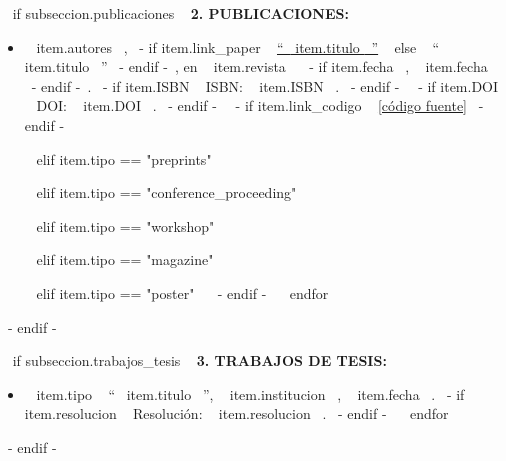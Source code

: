    ~{ if subseccion.publicaciones }~
      \textbf{2. PUBLICACIONES:}
      \begin{itemize}
      ~{ for item in subseccion.publicaciones }~
        ~{ if item.tipo == "articulo" }~
          \item ~{{ item.autores }}~, ~{- if item.link_paper }~ \href{~{{ item.link_paper }}~}{``~{{ item.titulo }}~''} ~{ else }~ ``~{{ item.titulo }}~'' ~{- endif -}~, en ~{{ item.revista }}~ ~{- if item.fecha }~, ~{{ item.fecha }}~ ~{- endif -}~.
                ~{- if item.ISBN }~ ISBN: ~{{ item.ISBN }}~. ~{- endif -}~
                ~{- if item.DOI }~ DOI: ~{{ item.DOI }}~. ~{- endif -}~
                ~{- if item.link_codigo }~ \href{~{{ item.link_codigo }}~}{[código fuente]} ~{- endif -}~
          \espacioEntreItems{}

        ~{ elif item.tipo == "preprints" }~

        ~{ elif item.tipo == "conference_proceeding" }~

        ~{ elif item.tipo == "workshop" }~

        ~{ elif item.tipo == "magazine" }~

        ~{ elif item.tipo == "poster" }~
        ~{- endif -}~
      ~{ endfor }~
      \end{itemize}
      \espacioEntreSubSecciones{}
    ~{- endif -}~

    ~{ if subseccion.trabajos_tesis }~
      \textbf{3. TRABAJOS DE TESIS:}
      \begin{itemize}
      ~{ for item in subseccion.trabajos_tesis }~
        \item ~{{ item.tipo }}~ ``~{{ item.titulo }}~'', ~{{ item.institucion }}~, ~{{ item.fecha }}~.
              ~{- if item.resolucion }~ Resolución: ~{{ item.resolucion }}~. ~{- endif -}~
        \espacioEntreItems{}
      ~{ endfor }~
      \end{itemize}
      \espacioEntreSubSecciones{}
    ~{- endif -}~

